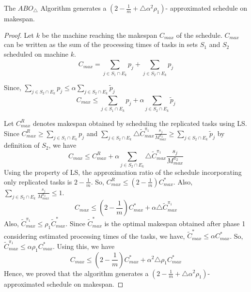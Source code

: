         \begin{theorem}
        \label{th:chapter5-la}
         The $ABO_\triangle$ Algorithm  generates a $ (2-\frac{1}{m}+\triangle\alpha^2 \rho_1) $- approximated schedule on makespan.
        \end{theorem}         
        \begin{proof}
        Let $k$ be the machine reaching the makespan $C_{max}$ of the schedule. $C_{max}$ can be written as the sum of the processing times of tasks in sets $S_1$ and $S_2$ scheduled on machine $k$.
        \begin{equation}\nonumber
  C_{max}= \sum_{j \in S_1 \cap E_k}^{}p_j+\sum_{j \in S_2 \cap E_k}^{}p_j 
        \end{equation}
        
        Since, $\sum\limits
        _{j \in S_2 \cap E_k}^{}p_j\leq\alpha\sum\limits
        _{j \in S_2 \cap E_k} \tilde{p}_j$
          \begin{equation}\nonumber
          C_{max} \leq \sum_{j \in S_1 \cap E_k}^{}p_j+\alpha\sum_{j \in S_2 \cap E_k} \tilde{p}_j 
                \end{equation}
       
        
        Let $C^R_{max}$ denotes makespan obtained by scheduling the replicated tasks using LS. Since $C^R_{max} \geq \sum\limits
        _{j \in S_1 \cap E_k}^{}p_j$ and $\sum\limits
        _{j \in S_2\cap E_k}\triangle {\tilde{C}^{\pi_1}_{max}} \frac{s_j}{M^{\pi_2}_{max}}\geq \sum\limits
        _{j \in S_2\cap E_k}^{}\tilde{p}_j $ by definition of $S_2$, we have
        \begin{equation}\nonumber
         C_{max}\leq C^R_{max}+\alpha\sum_{j \in S_2\cap E_k}^{}\triangle {\tilde{C}^{\pi_1}_{max}} \frac{s_j}{M^{\pi_2}_{max}}
               \end{equation}
         Using the property of LS, the approximation ratio of the schedule incorporating only replicated tasks is $2-\frac{1}{m}$. So, $C^R_{max} \leq (2-\frac{1}{m})C^{*}_{max}$. Also, $\sum\limits
         _{j\in S_2\cap E_k}^{} \frac{s_j}{M^{\pi_2}_{max}}\leq 1$. 
         \begin{equation}\nonumber
                 C_{max}\leq (2-\frac{1}{m})C^{*}_{max}+\alpha\triangle {\tilde{C}^{\pi_1}_{max}} 
                       \end{equation}
            Also,  ${\tilde{C}^{\pi_1}_{max}} \leq \rho_1 {\tilde{C}^{*}_{max}}$. Since $\tilde{C}^{*}_{max}$ is the optimal makespan obtained after phase 1 considering estimated processing times of the tasks, we have, $\tilde{C}^{*}_{max}\leq \alpha{C}^{*}_{max}$. So, ${\tilde{C}^{\pi_1}_{max}} \leq \alpha \rho_1{C}^{*}_{max}$. Using this, we have         
           \begin{equation}\nonumber
                         C_{max}\leq (2-\frac{1}{m}){{C}^{*}_{max}}+\alpha^2\triangle \rho_1 {{C}^{*}_{max}} 
                               \end{equation}
            Hence, we proved that the algorithm generates a $(2-\frac{1}{m}+\triangle \alpha^2\rho_1) $- approximated schedule on makespan.
            \end{proof}
